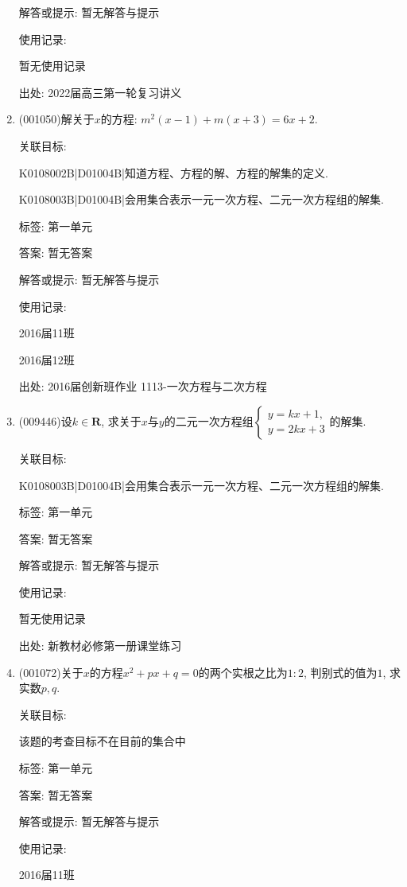 \documentclass[10pt,a4paper]{article}
\begin{document}
\begin{enumerate}[1.]
解答或提示: 暂无解答与提示

使用记录:

暂无使用记录


出处: 2022届高三第一轮复习讲义
\item { (001050)}解关于$x$的方程: $m^2(x-1)+m(x+3)=6x+2$.


关联目标:

K0108002B|D01004B|知道方程、方程的解、方程的解集的定义.

K0108003B|D01004B|会用集合表示一元一次方程、二元一次方程组的解集.



标签: 第一单元

答案: 暂无答案

解答或提示: 暂无解答与提示

使用记录:

2016届11班	

2016届12班	


出处: 2016届创新班作业	1113-一次方程与二次方程
\item { (009446)}设$k\in \mathbf{R}$, 求关于$x$与$y$的二元一次方程组$\begin{cases}y=kx+1, \\ y=2kx+3 \end{cases}$的解集.


关联目标:

K0108003B|D01004B|会用集合表示一元一次方程、二元一次方程组的解集.



标签: 第一单元

答案: 暂无答案

解答或提示: 暂无解答与提示

使用记录:

暂无使用记录


出处: 新教材必修第一册课堂练习
\item { (001072)}关于$x$的方程$x^2+px+q=0$的两个实根之比为$1:2$, 判别式的值为$1$, 求实数$p,q$.


关联目标:

该题的考查目标不在目前的集合中



标签: 第一单元

答案: 暂无答案

解答或提示: 暂无解答与提示

使用记录:

2016届11班	


\end{enumerate}
\end{document}
